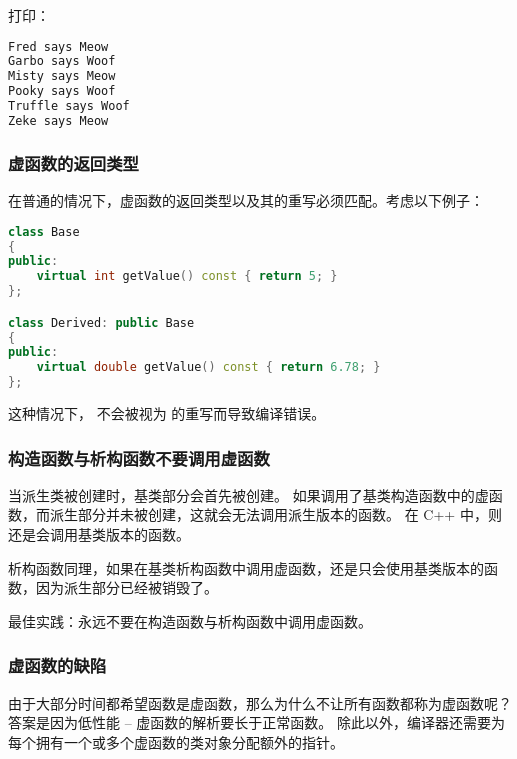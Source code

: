\documentclass[../../LearnCpp.tex]{subfiles}
\begin{document}
打印：

\begin{lstlisting}[language=C++]
Fred says Meow
Garbo says Woof
Misty says Meow
Pooky says Woof
Truffle says Woof
Zeke says Meow
\end{lstlisting}

\subsubsection*{虚函数的返回类型}

在普通的情况下，虚函数的返回类型以及其的重写必须匹配。考虑以下例子：

\begin{lstlisting}[language=C++]
class Base
{
public:
    virtual int getValue() const { return 5; }
};

class Derived: public Base
{
public:
    virtual double getValue() const { return 6.78; }
};
\end{lstlisting}

这种情况下， 不会被视为  的重写而导致编译错误。

\subsubsection*{构造函数与析构函数不要调用虚函数}

当派生类被创建时，基类部分会首先被创建。
如果调用了基类构造函数中的虚函数，而派生部分并未被创建，这就会无法调用派生版本的函数。
在 C++ 中，则还是会调用基类版本的函数。

析构函数同理，如果在基类析构函数中调用虚函数，还是只会使用基类版本的函数，因为派生部分已经被销毁了。

最佳实践：永远不要在构造函数与析构函数中调用虚函数。

\subsubsection*{虚函数的缺陷}

由于大部分时间都希望函数是虚函数，那么为什么不让所有函数都称为虚函数呢？
答案是因为低性能 -- 虚函数的解析要长于正常函数。
除此以外，编译器还需要为每个拥有一个或多个虚函数的类对象分配额外的指针。
\end{document}
